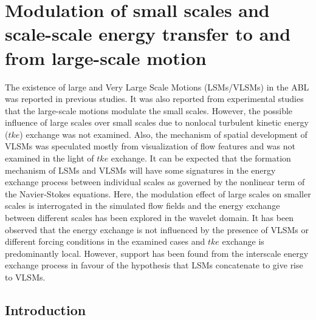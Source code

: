 
\chapter{Modulation of small scales and scale-scale energy transfer to and from large-scale motion}\label{chap:chap2}
The existence of large and Very Large Scale Motions (LSMs/VLSMs) in the ABL was reported in previous studies. It was also reported from experimental studies that the large-scale motions modulate the small scales. However, the possible influence of large scales over small scales due to nonlocal turbulent kinetic energy ($tke$) exchange was not examined. Also, the mechanism of spatial development of VLSMs was speculated mostly from visualization of flow features and was not examined in the light of $tke$ exchange. It can be expected that the formation mechanism of LSMs and VLSMs will have some signatures in the energy exchange process between individual scales as governed by the nonlinear term of the Navier-Stokes equations. Here, the modulation effect of large scales on smaller scales is interrogated in the simulated flow fields and the energy exchange between different scales has been explored in the wavelet domain. It has been observed that the energy exchange is not influenced by the presence of VLSMs or different forcing conditions in the examined cases and $tke$ exchange is predominantly local. However, support has been found from the interscale energy exchange process in favour of the hypothesis that LSMs concatenate to give rise to VLSMs.


\section{Introduction}

